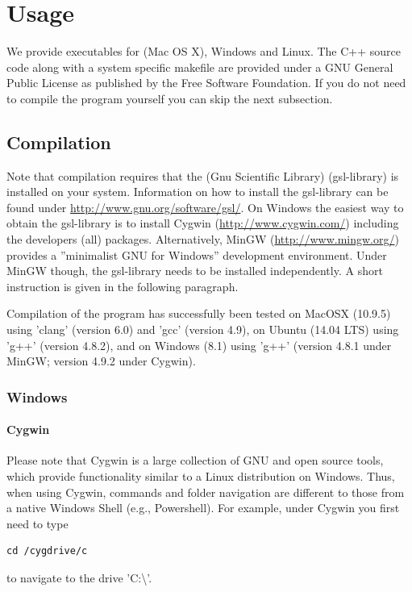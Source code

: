 \documentclass[12pt,a4paper]{scrartcl}
\begin{document}
\section{Usage} 
 
We provide executables for (Mac OS X), Windows and Linux. The C++ source code along with a system specific makefile are provided under a GNU General Public License as published by the Free Software Foundation. If you do not need to compile the program yourself you can skip the next subsection.
 
\subsection{Compilation} 

Note that compilation requires that the (Gnu Scientific Library) (gsl-library) is installed on your system. Information on how to install the gsl-library can be found under \url{http://www.gnu.org/software/gsl/}.
On Windows the easiest way to obtain the gsl-library is to install Cygwin (\url{http://www.cygwin.com/}) including the developers (all) packages. Alternatively, MinGW (\url{http://www.mingw.org/}) provides a ''minimalist GNU for Windows'' development environment. Under MinGW though, the gsl-library needs to be installed independently. A short instruction is given in the following paragraph.

Compilation of the program has successfully been tested on MacOSX (10.9.5) using 'clang' (version 6.0) and 'gcc' (version 4.9), on Ubuntu (14.04 LTS) using 'g++' (version 4.8.2), and on Windows (8.1) using 'g++' (version 4.8.1 under MinGW; version 4.9.2 under Cygwin).

\subsubsection*{Windows}

\paragraph*{Cygwin}
Please note that Cygwin is a large collection of GNU and open source tools, which provide functionality similar to a Linux distribution on Windows. Thus, when using Cygwin, commands and folder navigation are different to those from a native Windows Shell (e.g., Powershell).
For example, under Cygwin you first need to type 
\begin{lstlisting}
cd /cygdrive/c
\end{lstlisting}
to navigate to the drive 'C:\textbackslash'.
\end{document}
